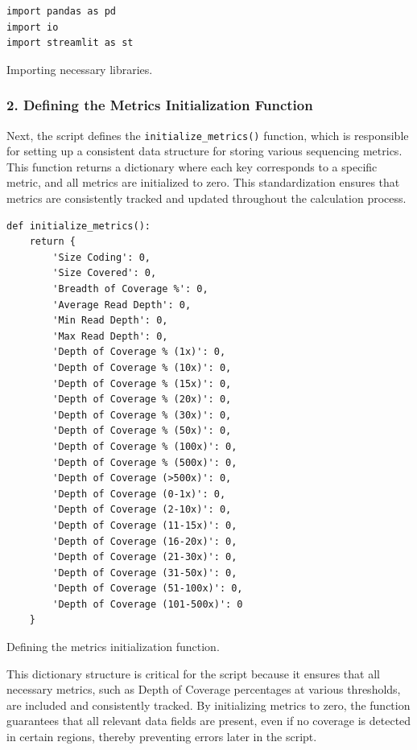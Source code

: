 \begin{longlisting}
\begin{verbatim}
import pandas as pd
import io
import streamlit as st
\end{verbatim}
\caption{Importing necessary libraries.}
\label{lbl:metrics_import}
\end{longlisting}

\subsubsection{\textbf{2. Defining the Metrics Initialization Function}}

Next, the script defines the \texttt{initialize\_metrics()} function, which is responsible for setting up a consistent data structure for storing various sequencing metrics. This function returns a dictionary where each key corresponds to a specific metric, and all metrics are initialized to zero. This standardization ensures that metrics are consistently tracked and updated throughout the calculation process.

\begin{longlisting}
\begin{verbatim}
def initialize_metrics():
    return {
        'Size Coding': 0,
        'Size Covered': 0,
        'Breadth of Coverage %': 0,
        'Average Read Depth': 0,
        'Min Read Depth': 0,
        'Max Read Depth': 0,
        'Depth of Coverage % (1x)': 0,
        'Depth of Coverage % (10x)': 0,
        'Depth of Coverage % (15x)': 0,
        'Depth of Coverage % (20x)': 0,
        'Depth of Coverage % (30x)': 0,
        'Depth of Coverage % (50x)': 0,
        'Depth of Coverage % (100x)': 0,
        'Depth of Coverage % (500x)': 0,
        'Depth of Coverage (>500x)': 0,
        'Depth of Coverage (0-1x)': 0,
        'Depth of Coverage (2-10x)': 0,
        'Depth of Coverage (11-15x)': 0,
        'Depth of Coverage (16-20x)': 0,
        'Depth of Coverage (21-30x)': 0,
        'Depth of Coverage (31-50x)': 0,
        'Depth of Coverage (51-100x)': 0,
        'Depth of Coverage (101-500x)': 0
    }
\end{verbatim}
\caption{Defining the metrics initialization function.}
\label{lbl:metrics_init}
\end{longlisting}

This dictionary structure is critical for the script because it ensures that all necessary metrics, such as Depth of Coverage percentages at various thresholds, are included and consistently tracked. By initializing metrics to zero, the function guarantees that all relevant data fields are present, even if no coverage is detected in certain regions, thereby preventing errors later in the script.

